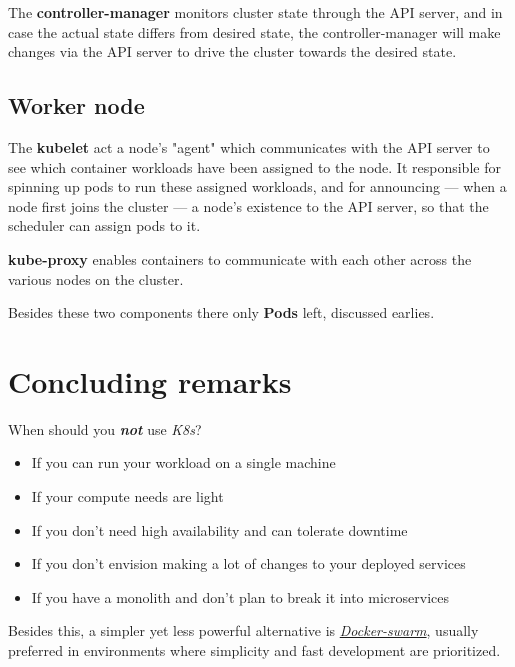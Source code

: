The \textbf{controller-manager} monitors cluster state through the API server, 
and in case the actual state differs from desired state,
the controller-manager will make changes via the API server to drive the cluster towards the desired state.

\subsection{Worker node}

The \textbf{kubelet} act a node's "agent" which communicates with
the API server to see which container workloads have been assigned to the node.
It responsible for spinning up pods to run these
assigned workloads, and for announcing {---} when a node first joins the cluster {---} a node's existence to the API server,
so that the scheduler can assign pods to it.

\textbf{kube-proxy} enables containers to communicate with each other across the various nodes on the cluster.

Besides these two components there only \textbf{Pods} left, discussed earlies.

\section{Concluding remarks}
When should you \textbf{\textit{not}} use \textit{K8s}?
\begin{itemize}
   \item If you can run your workload on a single machine
   \item If your compute needs are light
   \item If you don't need high availability and can tolerate downtime
   \item If you don't envision making a lot of changes to your deployed services
   \item If you have a monolith and don't plan to break it into microservices
\end{itemize}

Besides this,
a simpler yet less powerful alternative is \href{https://docs.docker.com/engine/swarm/}{\textit{Docker-swarm}},
usually preferred in environments where simplicity and fast development are prioritized.